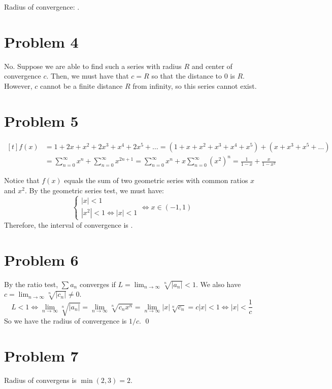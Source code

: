 \documentclass[preview, margin=0.6in]{standalone}
\newcommand*{\problem}[1]{\section*{Problem #1}}
\begin{document}
Radius of convergence: .

\problem{4}
No. Suppose we are able to find such a series with radius $R$ and center of convergence $c$. Then, we must have that $c=R$ so that the distance to $0$ is $R$. However, $c$ cannot be a finite distance $R$ from infinity, so this series cannot exist.

\problem{5}
$\begin{aligned}[t]
	f(x)
	&=1+2x+x^2+2x^3+x^4+2x^5+\ldots 
	=\left(1+x+x^2+x^3+x^4+x^5\right)+\left(x+x^3+x^5+\ldots\right) \\
	&=\sum_{n=0}^{\infty}x^n+\sum_{n=0}^{\infty}x^{2n+1}
	=\sum_{n=0}^{\infty}x^n+x\sum_{n=0}^{\infty}\left(x^2\right)^n
	=\boxed{\frac{1}{1-x}+\frac{x}{1-x^2}}
\end{aligned}$

Notice that $f(x)$ equals the sum of two geometric series with common ratios $x$ and $x^2$. By the geometric series test, we must have:
\begin{equation*}
	\left\{\begin{gathered}
		\left|x\right|<1 \\
		\left|x^2\right|<1 \iff \left|x\right|<1
	\end{gathered}\right.
	\iff x\in(-1,1)
\end{equation*}
Therefore, the interval of convergence is .

\problem{6}

By the ratio test, $\displaystyle \sum a_n$ converges if $L=\displaystyle \lim_{n\to\infty}\sqrt[n]{\left|a_n\right|}<1$. We also have $c=\displaystyle \lim_{n\to\infty} \sqrt[n]{\left|c_n\right|}\neq0$.
\begin{equation*}
	L<1
	\iff \lim_{n\to\infty}\sqrt [n]{\left|a_n\right|}
	=\lim_{n\to\infty} \sqrt[n]{c_n x^n}
	=\lim_{n\to\infty} \left|x\right|\sqrt[n]{c_n}
	=c \left|x\right|<1
	\iff \left|x\right|<\frac1c
\end{equation*}
So we have the radius of convergence is $1/c$. \qed

\problem{7}
Radius of convergens is $\min(2,3)=2$.
\end{document}
